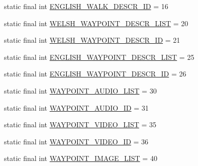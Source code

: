 \begin{DoxyCompactItemize}
\item 
static final int \hyperlink{classuk_1_1ac_1_1swan_1_1digitaltrails_1_1database_1_1_white_rock_content_provider_a559b5c5fa81fcf459bee57d6e8f2e410}{E\+N\+G\+L\+I\+S\+H\+\_\+\+W\+A\+L\+K\+\_\+\+D\+E\+S\+C\+R\+\_\+\+I\+D} = 16
\item 
static final int \hyperlink{classuk_1_1ac_1_1swan_1_1digitaltrails_1_1database_1_1_white_rock_content_provider_a3136aba0088be1e1d45c62211f44a0dc}{W\+E\+L\+S\+H\+\_\+\+W\+A\+Y\+P\+O\+I\+N\+T\+\_\+\+D\+E\+S\+C\+R\+\_\+\+L\+I\+S\+T} = 20
\item 
static final int \hyperlink{classuk_1_1ac_1_1swan_1_1digitaltrails_1_1database_1_1_white_rock_content_provider_afd9078666dbddb252f5dee69b65ef474}{W\+E\+L\+S\+H\+\_\+\+W\+A\+Y\+P\+O\+I\+N\+T\+\_\+\+D\+E\+S\+C\+R\+\_\+\+I\+D} = 21
\item 
static final int \hyperlink{classuk_1_1ac_1_1swan_1_1digitaltrails_1_1database_1_1_white_rock_content_provider_a4d3e1134b06221174a35f25f9990b742}{E\+N\+G\+L\+I\+S\+H\+\_\+\+W\+A\+Y\+P\+O\+I\+N\+T\+\_\+\+D\+E\+S\+C\+R\+\_\+\+L\+I\+S\+T} = 25
\item 
static final int \hyperlink{classuk_1_1ac_1_1swan_1_1digitaltrails_1_1database_1_1_white_rock_content_provider_a845e8091ba6fb7aa10d16e9e20457b61}{E\+N\+G\+L\+I\+S\+H\+\_\+\+W\+A\+Y\+P\+O\+I\+N\+T\+\_\+\+D\+E\+S\+C\+R\+\_\+\+I\+D} = 26
\item 
static final int \hyperlink{classuk_1_1ac_1_1swan_1_1digitaltrails_1_1database_1_1_white_rock_content_provider_a0ee6192005b6c23f93ed38eec4208dcb}{W\+A\+Y\+P\+O\+I\+N\+T\+\_\+\+A\+U\+D\+I\+O\+\_\+\+L\+I\+S\+T} = 30
\item 
static final int \hyperlink{classuk_1_1ac_1_1swan_1_1digitaltrails_1_1database_1_1_white_rock_content_provider_a732ab2abae9784a35981aa3756c49a5c}{W\+A\+Y\+P\+O\+I\+N\+T\+\_\+\+A\+U\+D\+I\+O\+\_\+\+I\+D} = 31
\item 
static final int \hyperlink{classuk_1_1ac_1_1swan_1_1digitaltrails_1_1database_1_1_white_rock_content_provider_ad3bb5f6897eebb90b124907bda067738}{W\+A\+Y\+P\+O\+I\+N\+T\+\_\+\+V\+I\+D\+E\+O\+\_\+\+L\+I\+S\+T} = 35
\item 
static final int \hyperlink{classuk_1_1ac_1_1swan_1_1digitaltrails_1_1database_1_1_white_rock_content_provider_ae965f98c33bfb673608befecc706146e}{W\+A\+Y\+P\+O\+I\+N\+T\+\_\+\+V\+I\+D\+E\+O\+\_\+\+I\+D} = 36
\item 
static final int \hyperlink{classuk_1_1ac_1_1swan_1_1digitaltrails_1_1database_1_1_white_rock_content_provider_a68614e903632646ad477995662528ce0}{W\+A\+Y\+P\+O\+I\+N\+T\+\_\+\+I\+M\+A\+G\+E\+\_\+\+L\+I\+S\+T} = 40

\end{DoxyCompactItemize}
